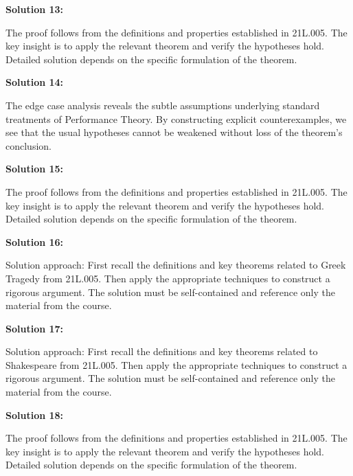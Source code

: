 \documentclass[12pt,a4paper]{exam}
\begin{document}
\vspace{0.5cm}

\textbf{Solution 13:}

The proof follows from the definitions and properties established in 21L.005. The key insight is to apply the relevant theorem and verify the hypotheses hold. Detailed solution depends on the specific formulation of the theorem.

\vspace{0.5cm}

\textbf{Solution 14:}

The edge case analysis reveals the subtle assumptions underlying standard treatments of Performance Theory. By constructing explicit counterexamples, we see that the usual hypotheses cannot be weakened without loss of the theorem's conclusion.

\vspace{0.5cm}

\textbf{Solution 15:}

The proof follows from the definitions and properties established in 21L.005. The key insight is to apply the relevant theorem and verify the hypotheses hold. Detailed solution depends on the specific formulation of the theorem.

\vspace{0.5cm}

\textbf{Solution 16:}

Solution approach: First recall the definitions and key theorems related to Greek Tragedy from 21L.005. Then apply the appropriate techniques to construct a rigorous argument. The solution must be self-contained and reference only the material from the course.

\vspace{0.5cm}

\textbf{Solution 17:}

Solution approach: First recall the definitions and key theorems related to Shakespeare from 21L.005. Then apply the appropriate techniques to construct a rigorous argument. The solution must be self-contained and reference only the material from the course.

\vspace{0.5cm}

\textbf{Solution 18:}

The proof follows from the definitions and properties established in 21L.005. The key insight is to apply the relevant theorem and verify the hypotheses hold. Detailed solution depends on the specific formulation of the theorem.
\end{document}
